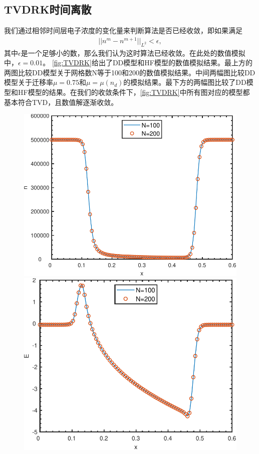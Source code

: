 \subsection{TVDRK时间离散}
我们通过相邻时间层电子浓度的变化量来判断算法是否已经收敛，即如果满足
\begin{align*}
    ||n^m - n^{m+1}||_{L^2} < \epsilon,
\end{align*}
其中$\epsilon$是一个足够小的数，那么我们认为这时算法已经收敛。在此处的数值模拟中，$\epsilon = 0.01$。
\autoref{fig:TVDRK}给出了DD模型和HF模型的数值模拟结果。最上方的两图比较DD模型关于网格数N等于100和200的数值模拟结果。中间两幅图比较DD模型关于迁移率$\mu=0.75$和$\mu = \mu(n_d)$的模拟结果。最下方的两幅图比较了DD模型和HF模型的结果。在我们的收敛条件下，\autoref{fig:TVDRK}中所有图对应的模型都基本符合TVD，且数值解逐渐收敛。
\begin{figure}
    \centering
    \begin{minipage}{0.45\linewidth}
        \centering
        \includegraphics[width=\linewidth]{figure/DDTVDRK3Degree2mu0.75Nn.pdf}
    \end{minipage}
    \hspace{1cm}
    \begin{minipage}{0.45\linewidth}
        \centering
        \includegraphics[width=\linewidth]{figure/DDTVDRK3Degree2mu0.75NE.pdf}

\end{minipage}
\end{figure}
